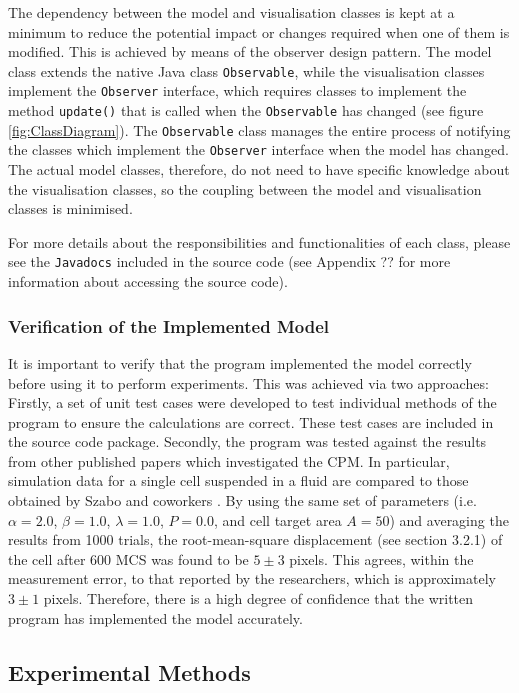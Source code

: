 \documentclass[a4paper,12pt]{article}
\begin{document}
The dependency between the model and visualisation classes is kept at a minimum to reduce the potential impact or changes required when one of them is modified. This is achieved by means of the observer design pattern. The model class extends the native Java class \texttt{Observable}, while the visualisation classes implement the \texttt{Observer} interface, which requires classes to implement the method \texttt{update()} that is called when the \texttt{Observable} has changed (see figure \ref{fig:ClassDiagram}). The \texttt{Observable} class manages the entire process of notifying the classes which implement the \texttt{Observer} interface when the model has changed. The actual model classes, therefore, do not need to have specific knowledge about the visualisation classes, so the coupling between the model and visualisation classes is minimised.

For more details about the responsibilities and functionalities of each class, please see the \texttt{Javadocs} included in the source code (see Appendix ?? for more information about accessing the source code). 

\subsubsection{Verification of the Implemented Model}
It is important to verify that the program implemented the model correctly before using it to perform experiments. This was achieved via two approaches: Firstly, a set of unit test cases were developed to test individual methods of the program to ensure the calculations are correct. These test cases are included in the source code package. Secondly, the program was tested against the results from other published papers which investigated the CPM. In particular, simulation data for a single cell suspended in a fluid are compared to those obtained by Szabo and coworkers \cite{szabo2010}. By using the same set of parameters (i.e. $\alpha = 2.0$, $\beta = 1.0$, $\lambda = 1.0$, $P = 0.0$, and cell target area $A = 50$) and averaging the results from 1000 trials, the root-mean-square displacement (see section 3.2.1) of the cell after 600 MCS was found to be $5 \pm 3$ pixels. This agrees, within the measurement error, to that reported by the researchers, which is approximately $3 \pm 1$ pixels. Therefore, there is a high degree of confidence that the written program has implemented the model accurately.


\subsection{Experimental Methods}
\end{document}

